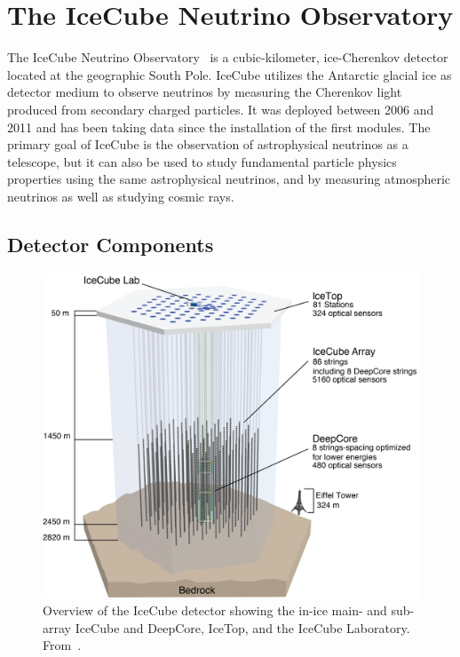 \setchapterpreamble[u]{\margintoc}


\chapter{The IceCube Neutrino Observatory}

The IceCube Neutrino Observatory~ is a cubic-kilometer, ice-Cherenkov detector located at the geographic South Pole. IceCube utilizes the Antarctic glacial ice as detector medium to observe neutrinos by measuring the Cherenkov light produced from secondary charged particles. It was deployed between 2006 and 2011 and has been taking data since the installation of the first modules. The primary goal of IceCube is the observation of astrophysical neutrinos as a telescope, but it can also be used to study fundamental particle physics properties using the same astrophysical neutrinos, and by measuring atmospheric neutrinos as well as studying cosmic rays.


\section{Detector Components} 

\begin{figure}[h]
    \includegraphics{figures/icecube_deepcore/IceCubeArray_slim.png}
	\caption[IceCube overview]{Overview of the IceCube detector showing the in-ice main- and sub-array IceCube and DeepCore, IceTop, and the IceCube Laboratory. From~\cite{2017JInst..12P3012A_Instrumentation_Systems}.}
\end{figure}

